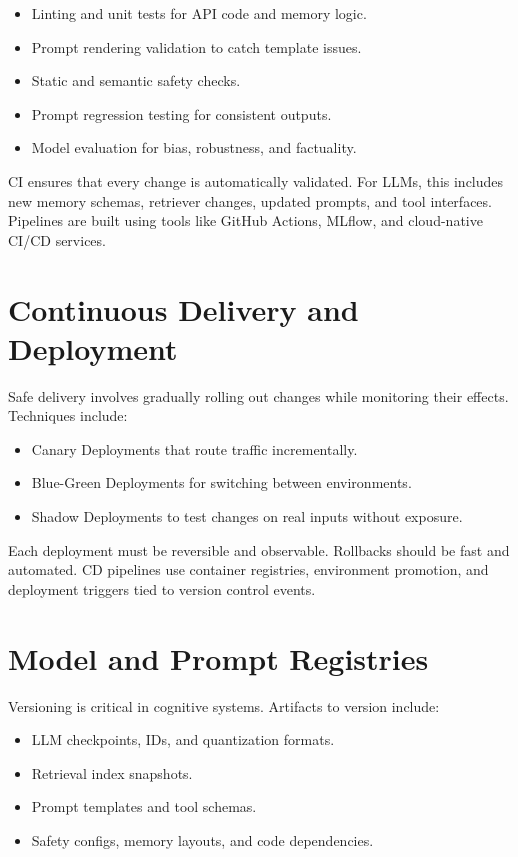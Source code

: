 \documentclass{book}
\begin{document}
\begin{itemize}
  \item Linting and unit tests for API code and memory logic.
  \item Prompt rendering validation to catch template issues.
  \item Static and semantic safety checks.
  \item Prompt regression testing for consistent outputs.
  \item Model evaluation for bias, robustness, and factuality.
\end{itemize}

CI ensures that every change is automatically validated. For LLMs, this includes new memory schemas, retriever changes, updated prompts, and tool interfaces. Pipelines are built using tools like GitHub Actions, MLflow, and cloud-native CI/CD services.

\section{Continuous Delivery and Deployment}

Safe delivery involves gradually rolling out changes while monitoring their effects. Techniques include:

\begin{itemize}
  \item Canary Deployments that route traffic incrementally.
  \item Blue-Green Deployments for switching between environments.
  \item Shadow Deployments to test changes on real inputs without exposure.
\end{itemize}

Each deployment must be reversible and observable. Rollbacks should be fast and automated. CD pipelines use container registries, environment promotion, and deployment triggers tied to version control events.

\section{Model and Prompt Registries}

Versioning is critical in cognitive systems. Artifacts to version include:

\begin{itemize}
  \item LLM checkpoints, IDs, and quantization formats.
  \item Retrieval index snapshots.
  \item Prompt templates and tool schemas.
  \item Safety configs, memory layouts, and code dependencies.
\end{itemize}
\end{document}
